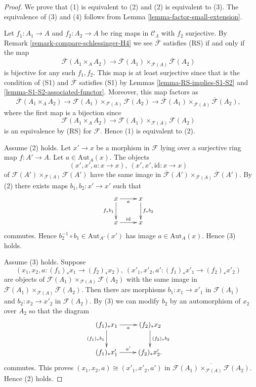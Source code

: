 \begin{proof}
We prove that (1) is equivalent to (2) and (2) is equivalent to (3).  The
equivalence of (3) and (4) follows from Lemma
\ref{lemma-factor-small-extension}.

\medskip\noindent
Let $f_1: A_1 \to A$ and $f_2: A_2 \to A$ be ring maps in
$\mathcal{C}_\Lambda$ with $f_2$ surjective. By
Remark \ref{remark-compare-schlessinger-H4}
we see $\overline{\mathcal{F}}$ satisfies (RS) if and
only if the map
$$
\overline{\mathcal{F}}(A_1 \times_A A_2) \to \overline{\mathcal
F}(A_1) \times_{\overline{\mathcal{F}}(A)} \overline{\mathcal{F}}(A_2)
$$
is bijective for any such $f_1, f_2$.
This map is at least surjective since that
is the condition of (S1) and $\overline{\mathcal{F}}$ satisfies (S1) by
Lemmas \ref{lemma-RS-implies-S1-S2} and
\ref{lemma-S1-S2-associated-functor}.
Moreover, this map factors as
$$
\overline{\mathcal{F}}(A_1 \times_A A_2)
\longrightarrow
\overline{\mathcal{F}(A_1) \times_{\mathcal{F}(A)} \mathcal{F}(A_2)}
\longrightarrow
\overline{\mathcal{F}}(A_1) \times_{\overline{\mathcal{F}}(A)}
\overline{\mathcal{F}}(A_2),
$$
where the first map is a bijection since
$$
\mathcal{F}(A_1 \times_A A_2)
\longrightarrow
\mathcal{F}(A_1) \times_{\mathcal{F}(A)} \mathcal{F}(A_2)
$$
is an equivalence by (RS) for $\mathcal{F}$. Hence (1) is equivalent to (2).

\medskip\noindent
Assume (2) holds. Let $x' \to x$ be a morphism in $\mathcal{F}$ lying
over a surjective ring map $f: A' \to A$. Let
$a \in \text{Aut}_A(x)$. The
objects
$$
(x', x', a : x \to x), \ (x', x', \text{id} : x \to x)
$$
of
$\mathcal{F}(A') \times_{\mathcal{F}(A)} \mathcal{F}(A')$
have the same image in
$\overline{\mathcal{F}}(A') \times_{\overline{\mathcal{F}}(A)}
\overline{\mathcal{F}}(A')$. By (2) there exists maps
$b_1, b_2 : x' \to x'$ such that
$$
\xymatrix{
x \ar[r]_a \ar[d]_{f_*b_1} & x \ar[d]^{f_*b_2} \\
x \ar[r]^{\text{id}} & x
}
$$
commutes. Hence $b_2^{-1} \circ b_1 \in \text{Aut}_{A'}(x')$ has image
$a \in \text{Aut}_A(x)$. Hence (3) holds.

\medskip\noindent
Assume (3) holds. Suppose
$$
(x_1, x_2, a : (f_1)_*x_1 \to (f_2)_*x_2),
\ (x'_1, x'_2, a' : (f_1)_*x'_1 \to (f_2)_*x'_2)
$$
are objects of
$\mathcal{F}(A_1) \times_{\mathcal{F}(A)} \mathcal{F}(A_2)$
with the same image in
$\overline{\mathcal{F}}(A_1) \times_{\overline{\mathcal{F}}(A)}
\overline{\mathcal{F}}(A_2)$. Then there are morphisms $b_1: x_1 \to
x'_1$ in $\mathcal{F}(A_1)$ and $b_2: x_2 \to x'_2$ in $\mathcal
F(A_2)$. By (3) we can modify $b_2$ by an automorphism of $x_2$ over $A_2$ so
that the diagram
$$
\xymatrix{
(f_1)_*x_1 \ar[r]_a \ar[d]_{(f_1)_*b_1} & (f_2)_*x_2 \ar[d]^{(f_2)_*b_2} \\
(f_1)_*x'_1 \ar[r]^{a'} & (f_2)_*x'_2.
}
$$
commutes. This proves $(x_1, x_2, a) \cong (x'_1, x'_2, a')$ in
$\overline{\mathcal{F}(A_1) \times_{\mathcal{F}(A)} \mathcal{F}(A_2)}$.
Hence (2) holds.
\end{proof}


